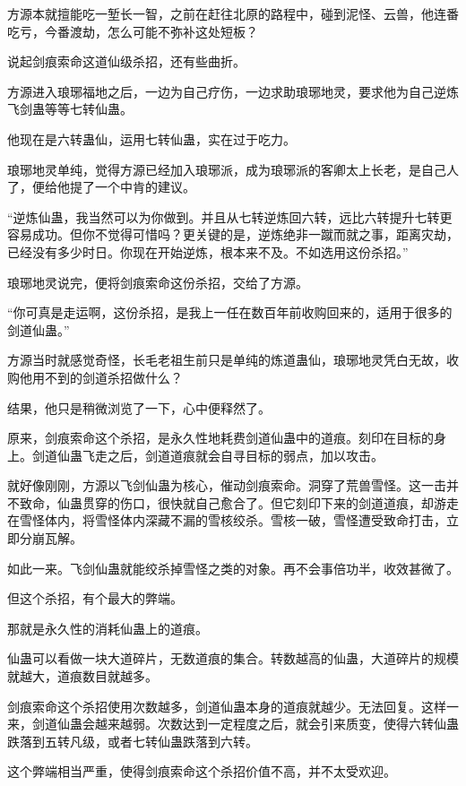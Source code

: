 
\begin{this_body}

方源本就擅能吃一堑长一智，之前在赶往北原的路程中，碰到泥怪、云兽，他连番吃亏，今番渡劫，怎么可能不弥补这处短板？

说起剑痕索命这道仙级杀招，还有些曲折。

方源进入琅琊福地之后，一边为自己疗伤，一边求助琅琊地灵，要求他为自己逆炼飞剑蛊等等七转仙蛊。

他现在是六转蛊仙，运用七转仙蛊，实在过于吃力。

琅琊地灵单纯，觉得方源已经加入琅琊派，成为琅琊派的客卿太上长老，是自己人了，便给他提了一个中肯的建议。

“逆炼仙蛊，我当然可以为你做到。并且从七转逆炼回六转，远比六转提升七转更容易成功。但你不觉得可惜吗？更关键的是，逆炼绝非一蹴而就之事，距离灾劫，已经没有多少时日。你现在开始逆炼，根本来不及。不如选用这份杀招。”

琅琊地灵说完，便将剑痕索命这份杀招，交给了方源。

“你可真是走运啊，这份杀招，是我上一任在数百年前收购回来的，适用于很多的剑道仙蛊。”

方源当时就感觉奇怪，长毛老祖生前只是单纯的炼道蛊仙，琅琊地灵凭白无故，收购他用不到的剑道杀招做什么？

结果，他只是稍微浏览了一下，心中便释然了。

原来，剑痕索命这个杀招，是永久性地耗费剑道仙蛊中的道痕。刻印在目标的身上。剑道仙蛊飞走之后，剑道道痕就会自寻目标的弱点，加以攻击。

就好像刚刚，方源以飞剑仙蛊为核心，催动剑痕索命。洞穿了荒兽雪怪。这一击并不致命，仙蛊贯穿的伤口，很快就自己愈合了。但它刻印下来的剑道道痕，却游走在雪怪体内，将雪怪体内深藏不漏的雪核绞杀。雪核一破，雪怪遭受致命打击，立即分崩瓦解。

如此一来。飞剑仙蛊就能绞杀掉雪怪之类的对象。再不会事倍功半，收效甚微了。

但这个杀招，有个最大的弊端。

那就是永久性的消耗仙蛊上的道痕。

仙蛊可以看做一块大道碎片，无数道痕的集合。转数越高的仙蛊，大道碎片的规模就越大，道痕数目就越多。

剑痕索命这个杀招使用次数越多，剑道仙蛊本身的道痕就越少。无法回复。这样一来，剑道仙蛊会越来越弱。次数达到一定程度之后，就会引来质变，使得六转仙蛊跌落到五转凡级，或者七转仙蛊跌落到六转。

这个弊端相当严重，使得剑痕索命这个杀招价值不高，并不太受欢迎。


\end{this_body}
